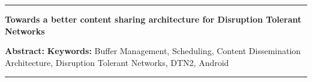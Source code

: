 \documentclass[a4paper,11pt,twoside]{ThesisStyle}
\begin{document}
\appendix



%




\cleardoublepage
\begin{vcenterpage}
\noindent\rule[2pt]{\textwidth}{0.5pt}
\begin{center}
{\large\textbf{Towards a better content sharing architecture for Disruption Tolerant Networks
\\}}
\end{center}
{\large\textbf{Abstract:}}
{\large\textbf{Keywords:}}
Buffer Management, Scheduling, Content Dissemination Architecture, Disruption Tolerant Networks, DTN2, Android  
\\
\noindent\rule[2pt]{\textwidth}{0.5pt}
\end{vcenterpage}
\end{document}
